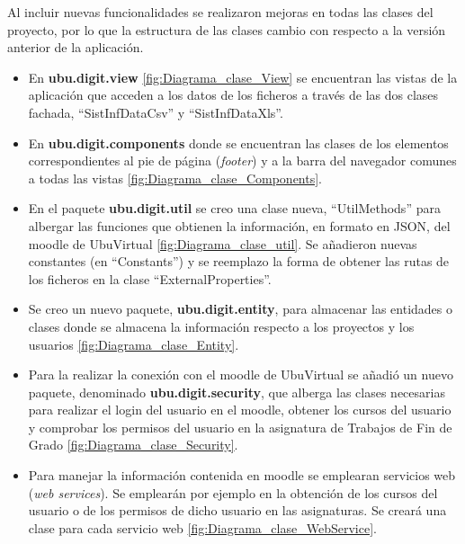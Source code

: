 
Al incluir nuevas funcionalidades se realizaron mejoras en todas las clases del proyecto, por lo que la estructura de las clases cambio con respecto a la versión anterior de la aplicación.
\begin{itemize}
	\tightlist
	\item En \textbf{ubu.digit.view} \ref{fig:Diagrama_clase_View} se encuentran las vistas de la aplicación que acceden a los datos de los ficheros a través de las dos clases fachada, ``SistInfDataCsv'' y  ``SistInfDataXls''.
	
	\item En \textbf{ubu.digit.components} donde se encuentran las clases de los elementos correspondientes al pie de página (\emph{footer}) y a la barra del navegador comunes a todas las vistas \ref{fig:Diagrama_clase_Components}. 
	
		
	\item En el paquete \textbf{ubu.digit.util} se creo una clase nueva, ``UtilMethods'' para albergar las funciones que obtienen la información, en formato en JSON, del moodle de UbuVirtual \ref{fig:Diagrama_clase_util}. Se añadieron nuevas constantes (en ``Constants'') y se reemplazo la forma de obtener las rutas de los ficheros en la clase ``ExternalProperties''.
	
	
	\item Se creo un nuevo paquete, \textbf{ubu.digit.entity}, para almacenar las entidades o clases donde se almacena la información respecto a los proyectos y los usuarios \ref{fig:Diagrama_clase_Entity}. 
	
	
	\item Para la realizar la conexión con el moodle de UbuVirtual se añadió un nuevo paquete, denominado \textbf{ubu.digit.security}, que alberga las clases necesarias para realizar el login del usuario en el moodle, obtener los cursos del usuario y comprobar los permisos del usuario en la asignatura de Trabajos de Fin de Grado \ref{fig:Diagrama_clase_Security}. 
	
	
	\item Para manejar la información contenida en moodle se emplearan servicios web (\emph{web services}). Se emplearán por ejemplo en la obtención de los cursos del usuario o de los permisos de dicho usuario en las asignaturas. Se creará una clase para cada servicio web  \ref{fig:Diagrama_clase_WebService}.
	
\end{itemize}

